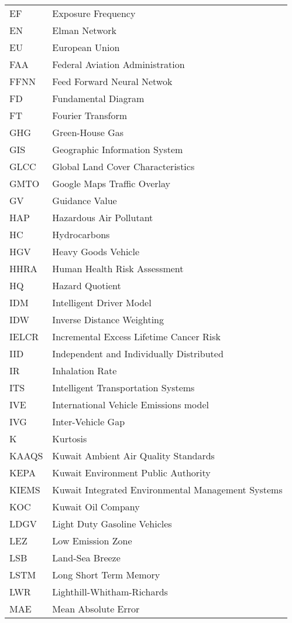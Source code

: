 \begin{longtable}{ll}
EF & Exposure Frequency \\
EN & Elman Network \\
EU & European Union \\
FAA & Federal Aviation Administration \\
FFNN & Feed Forward Neural Netwok \\
FD & Fundamental Diagram \\
FT & Fourier Transform \\
GHG & Green-House Gas \\
GIS & Geographic Information System \\
GLCC & Global Land Cover Characteristics \\
GMTO & Google Maps Traffic Overlay \\
GV & Guidance Value \\
HAP & Hazardous Air Pollutant \\
HC & Hydrocarbons \\
HGV & Heavy Goods Vehicle \\
HHRA & Human Health Risk Assessment \\
HQ & Hazard Quotient \\
IDM & Intelligent Driver Model \\
IDW & Inverse Distance Weighting \\
IELCR & Incremental Excess Lifetime Cancer Risk \\
IID & Independent and Individually Distributed \\
IR & Inhalation Rate \\
ITS & Intelligent Transportation Systems \\
IVE & International Vehicle Emissions model\\
IVG & Inter-Vehicle Gap \\
K & Kurtosis \\
KAAQS & Kuwait Ambient Air Quality Standards \\
KEPA & Kuwait Environment Public Authority \\
KIEMS & Kuwait Integrated Environmental Management Systems \\
KOC & Kuwait Oil Company \\
LDGV & Light Duty Gasoline Vehicles \\
LEZ & Low Emission Zone \\
LSB & Land-Sea Breeze \\
LSTM & Long Short Term Memory \\
LWR & Lighthill-Whitham-Richards \\
MAE & Mean Absolute Error \\

\end{longtable}
